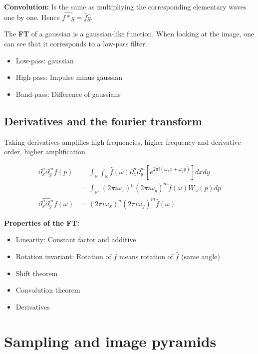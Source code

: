 \textbf{Convolution:} Is the same as multipliying the corresponding elementary waves one by one. Hence $\hat{f * g} = \hat{f} \hat{g}$.

The \textbf{FT} of a gaussian is a gaussian-like function. When looking at the image, one can see that it corresponds to a low-pass filter.

\begin{itemize}
    \item Low-pass: gaussian
    \item High-pass: Impulse minus gaussian
    \item Band-pass: Difference of gaussians
\end{itemize}

\subsection{Derivatives and the fourier transform}

Taking derivatives amplifies high frequencies, higher frequency and derivative order, higher amplification.

\begin{align*}
    \partial_x^n\partial_y^m f(p) & = \int_{\mathbb{R}}\int_{\mathbb{R}} \hat{f}(\omega) \partial_x^n\partial_y^m[e^{2\pi i(\omega_x x + \omega_y y)}] dx dy \\
    & = \int_{\mathbb{R}^2} (2\pi i \omega_x)^n (2\pi i \omega_y)^m \hat{f}(\omega) W_\omega (p) dp \\
 \hat{\partial_x^n\partial_y^m} f(\omega) & = (2\pi i \omega_x)^n (2\pi i \omega_y)^m \hat{f}(\omega)
\end{align*}

\textbf{Properties of the FT:}

\begin{itemize}
    \item Linearity: Constant factor and additive
    \item Rotation invariant: Rotation of $f$ means rotation of $\hat{f}$ (same angle)
    \item Shift theorem
    \item Convolution theorem
    \item Derivatives
\end{itemize}

\section{Sampling and image pyramids}

